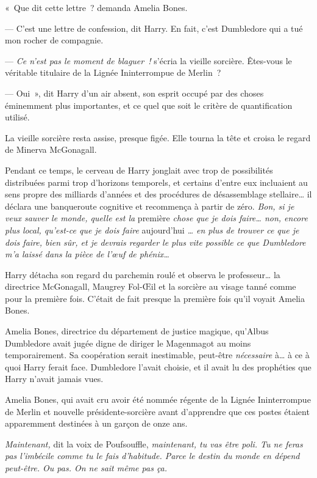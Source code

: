 «~Que dit cette lettre~? demanda Amelia Bones.

--- C'est une lettre de confession, dit Harry.
En fait, c'est Dumbledore qui a tué mon rocher de compagnie.

--- \emph{Ce n'est pas le moment de blaguer~!} s'écria la vieille sorcière.
Êtes-vous le véritable titulaire de la Lignée Ininterrompue de Merlin~?

--- Oui~», dit Harry d'un air absent, son esprit occupé par des choses éminemment plus importantes, et ce quel que soit le critère de quantification utilisé.

La vieille sorcière resta assise, presque figée.
Elle tourna la tête et croisa le regard de Minerva McGonagall.

Pendant ce temps, le cerveau de Harry jonglait avec trop de possibilités distribuées parmi trop d'horizons temporels, et certains d'entre eux incluaient au sens propre des milliards d'années et des procédures de désassemblage stellaire… il déclara une banqueroute cognitive et recommença à partir de zéro.
\emph{Bon, si je veux sauver le monde, quelle est la} première \emph{chose que je dois faire… non, encore plus local, qu'est-ce que je dois faire} aujourd'hui \emph{… en plus de trouver ce que je dois faire, bien sûr, et je devrais regarder le plus vite possible ce que Dumbledore m'a laissé dans la pièce de l'œuf de phénix…}

Harry détacha son regard du parchemin roulé et observa le professeur… la directrice McGonagall, Maugrey Fol-Œil et la sorcière au visage tanné comme pour la première fois.
C'était de fait presque la première fois qu'il voyait Amelia Bones.

Amelia Bones, directrice du département de justice magique, qu'Albus Dumbledore avait jugée digne de diriger le Magenmagot au moins temporairement.
Sa coopération serait inestimable, peut-être \emph{nécessaire} à… à ce à quoi Harry ferait face.
Dumbledore l'avait choisie, et il avait lu des prophéties que Harry n'avait jamais vues.

Amelia Bones, qui avait cru avoir été nommée régente de la Lignée Ininterrompue de Merlin et nouvelle présidente-sorcière avant d'apprendre que ces postes étaient apparemment destinées à un garçon de onze ans.

\emph{Maintenant,} dit la voix de Poufsouffle, \emph{maintenant, tu vas être poli.
Tu ne feras pas l'imbécile comme tu le fais d'habitude.
Parce le destin du monde en dépend peut-être.
Ou pas. On ne sait même pas ça.}

